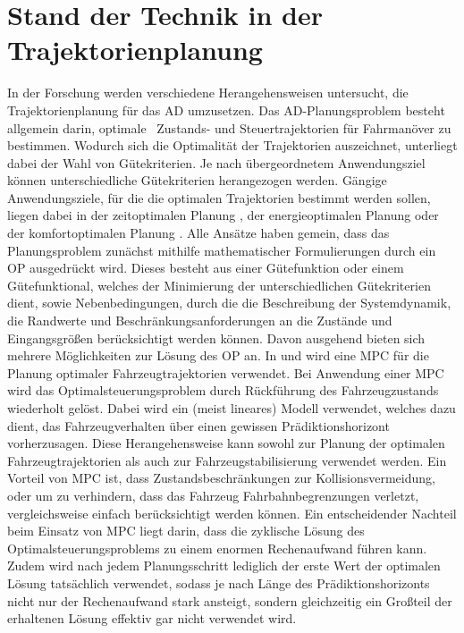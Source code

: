 \section{Stand der Technik in der Trajektorienplanung}
In der Forschung werden verschiedene Herangehensweisen untersucht, die Trajektorienplanung für das \gls{AD} umzusetzen. Das \gls{AD}-Planungsproblem besteht allgemein darin, \glqq optimale\grqq~ Zustands- und Steuertrajektorien für Fahrmanöver zu bestimmen. Wodurch sich die Optimalität der Trajektorien auszeichnet, unterliegt dabei der Wahl von Gütekriterien. Je nach übergeordnetem Anwendungsziel können unterschiedliche Gütekriterien herangezogen werden. Gängige Anwendungsziele, für die die optimalen Trajektorien bestimmt werden sollen, liegen dabei in der zeitoptimalen Planung \cite{Christ.2021}, der energieoptimalen Planung \cite{Tokekar.2014} oder der komfortoptimalen Planung \cite{Rathgeber.2016,Werling.2011}. Alle Ansätze haben gemein, dass das Planungsproblem zunächst mithilfe mathematischer Formulierungen durch ein \gls{OP} ausgedrückt wird. Dieses besteht aus einer Gütefunktion oder einem Gütefunktional, welches der Minimierung der unterschiedlichen Gütekriterien dient, sowie Nebenbedingungen, durch die die Beschreibung der Systemdynamik, die Randwerte und Beschränkungsanforderungen an die Zustände und Eingangsgrößen berücksichtigt werden können. Davon ausgehend bieten sich mehrere Möglichkeiten zur Lösung des \gls{OP} an. In \cite{Shi.2021} und \cite{Guo.2018} wird eine \gls{MPC} für die Planung optimaler Fahrzeugtrajektorien verwendet. Bei Anwendung einer \gls{MPC} wird das Optimalsteuerungsproblem durch Rückführung des Fahrzeugzustands wiederholt gelöst. Dabei wird ein (meist lineares) Modell verwendet, welches dazu dient, das Fahrzeugverhalten über einen gewissen Prädiktionshorizont vorherzusagen. Diese Herangehensweise kann sowohl zur Planung der optimalen Fahrzeugtrajektorien als auch zur Fahrzeugstabilisierung verwendet werden. Ein Vorteil von \gls{MPC} ist, dass Zustandsbeschränkungen zur Kollisionsvermeidung, oder um zu verhindern, dass das Fahrzeug Fahrbahnbegrenzungen verletzt, vergleichsweise einfach berücksichtigt werden können. Ein entscheidender Nachteil beim Einsatz von \gls{MPC} liegt darin, dass die zyklische Lösung des Optimalsteuerungsproblems zu einem enormen Rechenaufwand führen kann. Zudem wird nach jedem Planungsschritt lediglich der erste Wert der optimalen Lösung tatsächlich verwendet, sodass je nach Länge des Prädiktionshorizonts nicht nur der Rechenaufwand stark ansteigt, sondern gleichzeitig ein Großteil der erhaltenen Lösung effektiv gar nicht verwendet wird.  

